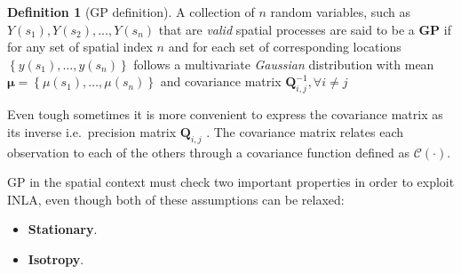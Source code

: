\documentclass[
  12pt,
  a4paper,
  oneside]{book}
\providecommand{\tightlist}{%
  \setlength{\itemsep}{0pt}\setlength{\parskip}{0pt}}
\theoremstyle{definition}
\newtheorem{definition}{Definition}[chapter]
\theoremstyle{definition}
\theoremstyle{definition}
\theoremstyle{remark}
\begin{document}
\begin{definition}[GP definition]
\protect\hypertarget{def:GP}{}{\label{def:GP} {} }A collection of \(n\) random variables, such as \(Y(s_{1}), Y(s_{2}) , \ldots, Y(s_{n})\) that are \emph{valid} spatial processes are said to be a \textbf{GP} if for any set of spatial index \(n\) and for each set of corresponding locations \(\left\{y\left(s_{1}\right), \ldots, y\left(s_{n}\right)\right\}\) follows a multivariate \emph{Gaussian} distribution with mean \(\boldsymbol{\mu}=\left\{\mu\left(s_{1}\right), \ldots, \mu\left(s_{n}\right)\right\}\) and covariance matrix \(\mathbf{Q}^{-1}_{i,j}, \forall i \neq j\)
\end{definition}

Even tough sometimes it is more convenient to express the covariance matrix as its inverse i.e.~precision matrix \(\boldsymbol{Q}_{i,j}\) \citep{Blangiardo-Cameletti}. The covariance matrix relates each observation to each of the others through a covariance function defined as \(\mathcal{C}(\cdot)\).

GP in the spatial context must check two important properties in order to exploit INLA, even though both of these assumptions can be relaxed:

\begin{itemize}
\tightlist
\item
  \textbf{Stationary}.
\item
  \textbf{Isotropy}.
\end{itemize}
\end{document}
